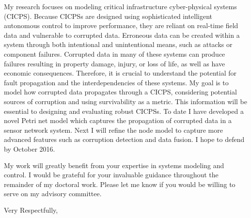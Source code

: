 \documentclass{letter}
\begin{document}
\begin{letter}
My research focuses on modeling critical infrastructure cyber-physical systems (CICPS). Because CICPSs are designed using sophisticated intelligent autonomous control to improve performance, they are reliant on real-time field data and vulnerable to corrupted data. Erroneous data can be created within a system through both intentional and unintentional means, such as attacks or component failures. Corrupted data in many of these systems can produce failures resulting in property damage, injury, or loss of life, as well as have economic consequences. Therefore, it is crucial to understand the potential for fault propagation and the interdependencies of these systems. My goal is to model how corrupted data propagates through a CICPS, considering potential sources of corruption and using survivability as a metric. This information will be essential to designing and evaluating robust CICPSs. To date I have developed a novel Petri net model which captures the propagation of corrupted data in a sensor network system. Next I will refine the node model to capture more advanced features such as corruption detection and data fusion. I hope to defend by October 2016.

My work will greatly benefit from your expertise in
systems modeling and control.
I would be grateful for your invaluable guidance throughout the remainder of my doctoral work. Please let me know if you would be willing to serve on my advisory committee.

\closing{Very Respectfully,}
\end{letter}
\end{document}
